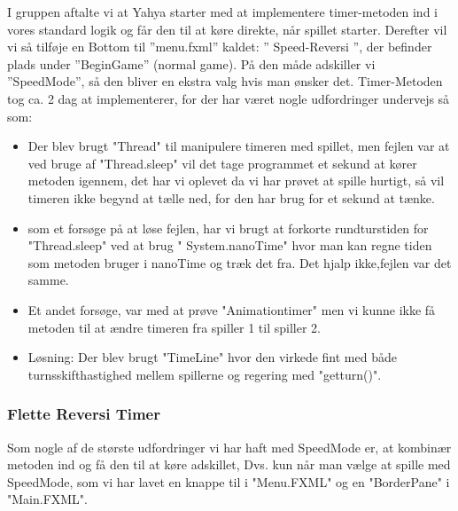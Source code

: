 I gruppen aftalte vi at Yahya starter med at implementere timer-metoden ind i vores standard logik og får den til at køre direkte, når spillet starter. Derefter vil vi så tilføje en Bottom til ”menu.fxml” kaldet: ” Speed-Reversi ”, der befinder plads under ”BeginGame” (normal game).
På den måde adskiller vi ”SpeedMode”, så den bliver en ekstra valg hvis man ønsker det. 
Timer-Metoden tog ca. 2 dag at implementerer, for der har været nogle udfordringer undervejs så som: 
\begin{itemize}

\item Der blev brugt "Thread" til manipulere timeren med spillet, men fejlen var at ved bruge af "Thread.sleep" vil det tage programmet et sekund at kører metoden igennem, det har vi oplevet da vi har prøvet at spille hurtigt, så vil timeren ikke begynd at tælle ned, for den har brug for et sekund at tænke. 
\item som et forsøge på at løse fejlen, har vi brugt at forkorte rundturstiden for "Thread.sleep" ved at brug " System.nanoTime" hvor man kan regne tiden som metoden bruger i nanoTime og træk det fra. Det hjalp ikke,fejlen var det samme. 
\item Et andet forsøge, var med at prøve "Animationtimer" men vi kunne ikke få metoden til at ændre timeren fra spiller 1 til spiller 2. 

\item Løsning: 
Der blev brugt "TimeLine" hvor den virkede fint med både turnsskifthastighed mellem spillerne og regering med "getturn()". 
\end{itemize}
\subsubsection{Flette Reversi Timer}\label{FRT}
Som nogle af de største udfordringer vi har haft med SpeedMode er, at kombinær metoden ind og få den til at køre adskillet, Dvs. kun når man vælge at spille med SpeedMode, som vi har lavet en knappe til i "Menu.FXML" og en "BorderPane" i "Main.FXML".
